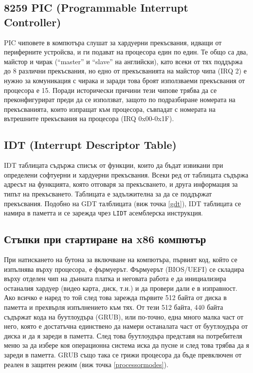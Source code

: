   \subsection{8259 PIC (Programmable Interrupt Controller)} \label{pic}
  PIC чиповете в компютъра слушат за хардуерни прекъсвания, идващи от периферните устройсва, и ги подават на процесора един по един. Те общо са два, майстор и чирак (``master'' и ``slave'' на английски), като всеки от тях поддържа до 8 различни прекъсвания, но едно от прекъсванията на майстор чипа (IRQ 2) е нужно за комуникация с чирака и заради това броят използваеми прекъсвания от процесора е 15. Поради исторически причини тези чипове трябва да се преконфигурират преди да се използват, защото по подразбиране номерата на прекъсванията, които изпращат към процесора, съвпадат с номерата на вътрешните прекъсвания на процесора (IRQ 0x00-0x1F).

  \subsection{IDT (Interrupt Descriptor Table)} \label{idt}
  IDT таблицата съдържа списък от функции, които да бъдат извикани при определени софтуерни и хардуерни прекъсвания. Всеки ред от таблицата съдържа адресът на функцията, която отговаря за прекъсването, и друга информация за типът на прекъсването. Таблицата е задължителна за да се поддържат прекъсвания. Подобно на GDT талблицата (виж точка \ref{gdt}), IDT таблицата се намира в паметта и се зарежда чрез {\tt LIDT} асемблерска инструкция.

  \subsection{Стъпки при стартиране на x86 компютър}
  При натискането на бутона за включване на компютъра, първият код, който се изпълнява върху процесора, е фърмуерът. Фърмуерът (BIOS/UEFI) се складира върху отделен чип на дънната платка и неговата работа е да инициализира останалия хардуер (видео карта, диск, т.н.) и да провери дали е в изправност. Ако всичко е наред то той след това зарежда първите 512 байта от диска в паметта и прехвърля изпълнението към тях. От тези 512 байта, 440 байта съдържат кода на буутлоудъра (GRUB), или по-точно, една много малка част от него, която е достатъчна единствено да намери останалата част от буутлоудъра от диска и да я зареди в паметта. След това буутлоудъра представя на потребителя меню за да избере коя операционна система иска да пусне и след това трябва да я зареди в паметта. GRUB също така се грижи процесора да бъде превключен от реален в защитен режим (виж точка \ref{processormodes}).

